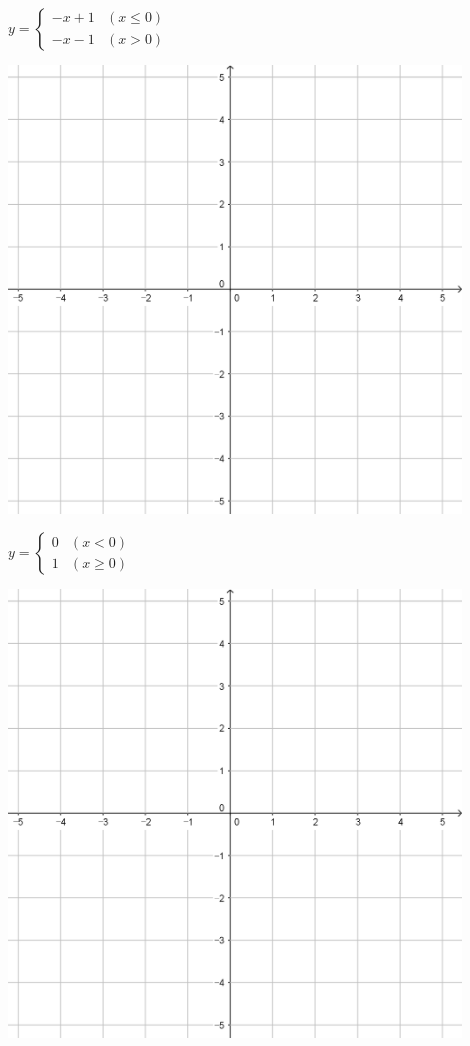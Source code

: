 \documentclass[a4paper]{oblivoir}
\begin{document}
\begin{minipage}{0.45\textwidth}\centering
\(y=\begin{cases}-x+1&(x\le0)\\-x-1&(x>0)\end{cases}\)
\par\bigskip\includegraphics[width=0.9\textwidth]{55}
\end{minipage}
\begin{minipage}{0.45\textwidth}\centering
\(y=\begin{cases}0&(x<0)\\1&(x\ge0)\end{cases}\)
\par\bigskip\includegraphics[width=0.9\textwidth]{55}
\end{minipage}\bigskip\bigskip\par
\end{document}
